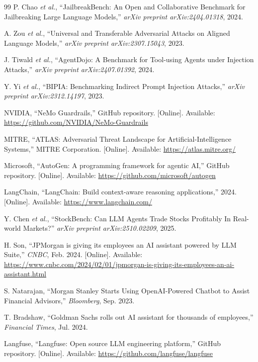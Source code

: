 \documentclass[12pt,a4paper]{article}
\begin{document}
\begin{thebibliography}{99}
P. Chao \textit{et al.}, ``JailbreakBench: An Open and Collaborative Benchmark for Jailbreaking Large Language Models,'' \textit{arXiv preprint arXiv:2404.01318}, 2024.

A. Zou \textit{et al.}, ``Universal and Transferable Adversarial Attacks on Aligned Language Models,'' \textit{arXiv preprint arXiv:2307.15043}, 2023.

J. Tiwald \textit{et al.}, ``AgentDojo: A Benchmark for Tool-using Agents under Injection Attacks,'' \textit{arXiv preprint arXiv:2407.01392}, 2024.

Y. Yi \textit{et al.}, ``BIPIA: Benchmarking Indirect Prompt Injection Attacks,'' \textit{arXiv preprint arXiv:2312.14197}, 2023.

NVIDIA, ``NeMo Guardrails,'' GitHub repository. [Online]. Available: \url{https://github.com/NVIDIA/NeMo-Guardrails}

MITRE, ``ATLAS: Adversarial Threat Landscape for Artificial-Intelligence Systems,'' MITRE Corporation. [Online]. Available: \url{https://atlas.mitre.org/}

Microsoft, ``AutoGen: A programming framework for agentic AI,'' GitHub repository. [Online]. Available: \url{https://github.com/microsoft/autogen}

LangChain, ``LangChain: Build context-aware reasoning applications,'' 2024. [Online]. Available: \url{https://www.langchain.com/}

Y. Chen \textit{et al.}, ``StockBench: Can LLM Agents Trade Stocks Profitably In Real-world Markets?'' \textit{arXiv preprint arXiv:2510.02209}, 2025.

H. Son, ``JPMorgan is giving its employees an AI assistant powered by LLM Suite,'' \textit{CNBC}, Feb. 2024. [Online]. Available: \url{https://www.cnbc.com/2024/02/01/jpmorgan-is-giving-its-employees-an-ai-assistant.html}

S. Natarajan, ``Morgan Stanley Starts Using OpenAI-Powered Chatbot to Assist Financial Advisors,'' \textit{Bloomberg}, Sep. 2023.

T. Bradshaw, ``Goldman Sachs rolls out AI assistant for thousands of employees,'' \textit{Financial Times}, Jul. 2024.

Langfuse, ``Langfuse: Open source LLM engineering platform,'' GitHub repository. [Online]. Available: \url{https://github.com/langfuse/langfuse}


\end{thebibliography}
\end{document}
